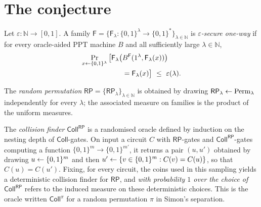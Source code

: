 \documentclass{aicr-conjecture}
\newcommand{\Fs}{\mathsf{F}}          %
\newcommand{\RP}{\mathsf{RP}}         %
\newcommand{\Coll}{\mathsf{Coll}}     %
\newcommand{\bits}{\{0,1\}}
\newcommand{\Perm}{\mathrm{Perm}}
\begin{document}
\section{The conjecture}\label{sec:conjectures}

\begin{definition}\label{def:owf}
Let $\varepsilon\colon\mathbb{N}\to[0,1]$. A family
$\Fs=\{\Fs_\lambda\colon\bits^{\lambda}\to\bits^{*}\}_{
\lambda\in\mathbb{N}}$ is \emph{$\varepsilon$-secure one-way} if for
every oracle-aided PPT machine $B$ and all sufficiently large
$\lambda\in\mathbb{N}$,
\begin{align*}
  \Pr_{x\sample\bits^{\lambda}}\big[\Fs_{\lambda}\big(&
    B^{\Fs}(1^{\lambda},\Fs_{\lambda}(x))\big)\\
  &=\Fs_{\lambda}(x)\big]\ \le\ \varepsilon(\lambda).
\end{align*}
\end{definition}

\begin{definition}\label{def:coll}
The \emph{random permutation}
$\RP=\{\RP_\lambda\}_{\lambda\in\mathbb{N}}$ is obtained by drawing
$\RP_\lambda\sample\Perm_\lambda$ independently for every $\lambda$; the
associated measure on families is the product of the uniform measures.

The \emph{collision finder} $\Coll^{\RP}$ is a randomised oracle defined
by induction on the nesting depth of $\Coll$-gates. On input a circuit
$C$ with $\RP$-gates and $\Coll^{\RP}$-gates computing a function
$\bits^{m}\to\bits^{m'}$, it returns a pair $(u,u')$ obtained by drawing
$u\sample\bits^{m}$ and then
$u'\sample\{v\in\bits^{m}: C(v)=C(u)\}$, so that $C(u)=C(u')$. Fixing,
for every circuit, the coins used in this sampling yields a
deterministic collision finder for $\RP$, and \emph{with probability $1$
over the choice of $\Coll^{\RP}$} refers to the induced measure on these
deterministic choices. This is the oracle written $\Coll^{\pi}$ for a
random permutation $\pi$ in Simon's separation.
\end{definition}
\end{document}
